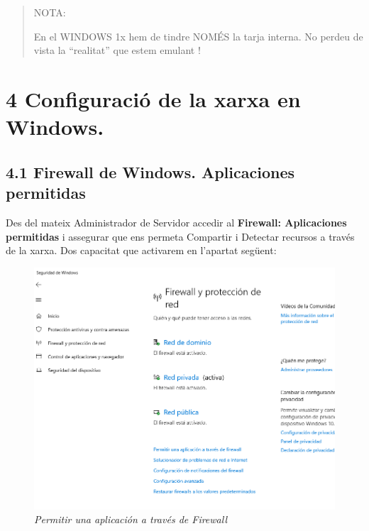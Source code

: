 \documentclass[
  a4paper,
]{article}
\begin{document}
\begin{quote}
NOTA:

En el WINDOWS 1x hem de tindre NOMÉS la tarja interna. No perdeu de
vista la ``realitat'' que estem emulant !
\end{quote}

\section{4 Configuració de la xarxa en
Windows.}\label{configuraciuxf3-de-la-xarxa-en-windows.}

\subsection{4.1 Firewall de Windows. Aplicaciones
permitidas}\label{firewall-de-windows.-aplicaciones-permitidas}

Des del mateix Administrador de Servidor accedir al \textbf{Firewall:
Aplicaciones permitidas} i assegurar que ens permeta Compartir i
Detectar recursos a través de la xarxa. Dos capacitat que activarem en
l'apartat següent:

\begin{figure}
\centering
\includegraphics{png/ADDS/PermitirUnaAplicacionATravesdeFirewall.png}
\caption{\emph{Permitir una aplicación a través de Firewall}}
\end{figure}
\end{document}
